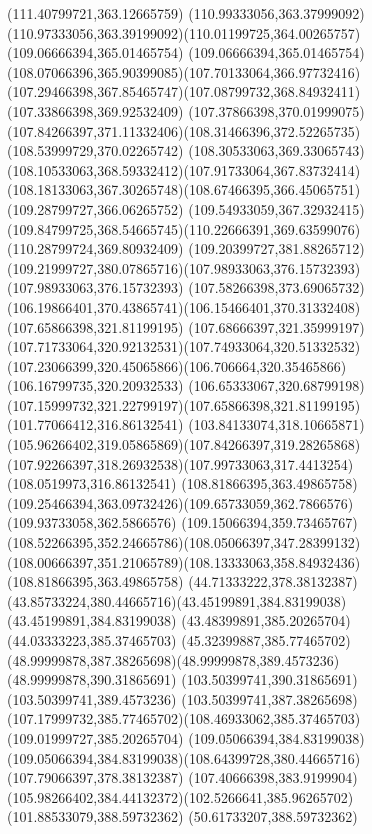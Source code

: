{{\lineto(111.40799721,363.12665759)
\lineto(110.99333056,363.37999092)
\curveto(110.97333056,363.39199092)(110.01199725,364.00265757)(109.06666394,365.01465754)
\curveto(109.06666394,365.01465754)(108.07066396,365.90399085)(107.70133064,366.97732416)
\curveto(107.29466398,367.85465747)(107.08799732,368.84932411)(107.33866398,369.92532409)
\curveto(107.37866398,370.01999075)(107.84266397,371.11332406)(108.31466396,372.52265735)
\lineto(108.53999729,370.02265742)
\curveto(108.30533063,369.33065743)(108.10533063,368.59332412)(107.91733064,367.83732414)
\curveto(108.18133063,367.30265748)(108.67466395,366.45065751)(109.28799727,366.06265752)
\curveto(109.54933059,367.32932415)(109.84799725,368.54665745)(110.22666391,369.63599076)
\lineto(110.28799724,369.80932409)
\lineto(109.20399727,381.88265712)
\curveto(109.21999727,380.07865716)(107.98933063,376.15732393)(107.98933063,376.15732393)
\curveto(107.58266398,373.69065732)(106.19866401,370.43865741)(106.15466401,370.31332408)
\moveto(107.65866398,321.81199195)
\curveto(107.68666397,321.35999197)(107.71733064,320.92132531)(107.74933064,320.51332532)
\curveto(107.23066399,320.45065866)(106.706664,320.35465866)(106.16799735,320.20932533)
\curveto(106.65333067,320.68799198)(107.15999732,321.22799197)(107.65866398,321.81199195)
\moveto(101.77066412,316.86132541)
\curveto(103.84133074,318.10665871)(105.96266402,319.05865869)(107.84266397,319.28265868)
\curveto(107.92266397,318.26932538)(107.99733063,317.4413254)(108.0519973,316.86132541)
\closepath
\moveto(108.81866395,363.49865758)
\curveto(109.25466394,363.09732426)(109.65733059,362.7866576)(109.93733058,362.5866576)
\curveto(109.15066394,359.73465767)(108.52266395,352.24665786)(108.05066397,347.28399132)
\curveto(108.00666397,351.21065789)(108.13333063,358.84932436)(108.81866395,363.49865758)
\moveto(44.71333222,378.38132387)
\curveto(43.85733224,380.44665716)(43.45199891,384.83199038)(43.45199891,384.83199038)
\lineto(43.48399891,385.20265704)
\lineto(44.03333223,385.37465703)
\curveto(45.32399887,385.77465702)(48.99999878,387.38265698)(48.99999878,389.4573236)
\lineto(48.99999878,390.31865691)
\lineto(103.50399741,390.31865691)
\lineto(103.50399741,389.4573236)
\curveto(103.50399741,387.38265698)(107.17999732,385.77465702)(108.46933062,385.37465703)
\lineto(109.01999727,385.20265704)
\lineto(109.05066394,384.83199038)
\curveto(109.05066394,384.83199038)(108.64399728,380.44665716)(107.79066397,378.38132387)
\lineto(107.40666398,383.9199904)
\curveto(105.98266402,384.44132372)(102.5266641,385.96265702)(101.88533079,388.59732362)
\lineto(50.61733207,388.59732362)
}}
